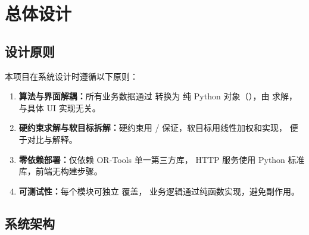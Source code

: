﻿%
\section{总体设计}

\subsection{设计原则}

本项目在系统设计时遵循以下原则：
\begin{enumerate}[leftmargin=2em,itemsep=0.2em]
\item \textbf{算法与界面解耦：}所有业务数据通过  转换为
纯 Python 对象（），由  求解，
与具体 UI 实现无关。
\item \textbf{硬约束求解与软目标拆解：}硬约束用  /
 保证，软目标用线性加权和实现，
便于对比与解释。
\item \textbf{零依赖部署：}仅依赖 OR-Tools 单一第三方库，
HTTP 服务使用 Python 标准库，前端无构建步骤。
\item \textbf{可测试性：}每个模块可独立  覆盖，
业务逻辑通过纯函数实现，避免副作用。
\end{enumerate}

\subsection{系统架构}

